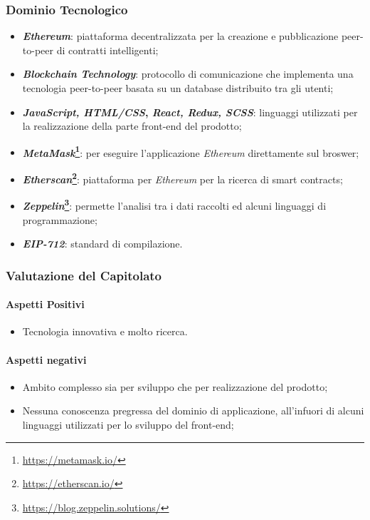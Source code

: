 \subsubsection{Dominio Tecnologico}

\begin{itemize}
  \item \textbf{\textit{Ethereum}\glossario}: piattaforma decentralizzata per la creazione e pubblicazione peer-to-peer di contratti intelligenti;
  \item \textbf{\textit{Blockchain Technology}\glossario}: protocollo di comunicazione che implementa una tecnologia peer-to-peer basata su un database distribuito tra gli utenti;
  \item \textbf{\textit{JavaScript, HTML/CSS},  \textit{React\glossario, Redux\glossario, SCSS\glossario}}: linguaggi utilizzati per la realizzazione della parte front-end del prodotto;
  \item \textbf{\textit{MetaMask}\footnote{\url{https://metamask.io/}}\glossario}: per eseguire l'applicazione \textit{Ethereum} direttamente sul broswer;
  \item \textbf{\textit{Etherscan}\footnote{\url{https://etherscan.io/}}\glossario}: piattaforma per \textit{Ethereum} per la ricerca di smart contracts;
  \item \textbf{\textit{Zeppelin}\footnote{\url{https://blog.zeppelin.solutions/}}\glossario}: permette l'analisi tra i dati raccolti ed alcuni linguaggi di programmazione;
  \item \textbf{\textit{EIP-712}}: standard di compilazione.
\end{itemize}

\subsubsection{Valutazione del Capitolato}
\paragraph{Aspetti Positivi}
\begin{itemize}
  \item Tecnologia innovativa e molto ricerca.
\end{itemize}

\paragraph{Aspetti negativi}
\begin{itemize}
  \item Ambito complesso sia per sviluppo che per realizzazione del prodotto;
  \item Nessuna conoscenza pregressa del dominio di applicazione, all'infuori di alcuni linguaggi utilizzati per lo sviluppo del front-end;
\end{itemize}

